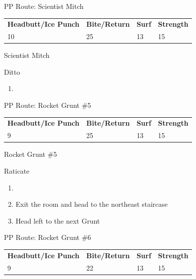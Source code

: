 \begin{paracol}{2}
\switchcolumn*
\begin{misc}{PP Route: Scientist Mitch}
	\varwb
	\begin{tabu} to \textwidth {X[6,c] X[5,c] X[4,c] X[4,c]}
		\textbf{Headbutt/Ice Punch} & \textbf{Bite/Return} & \textbf{Surf} & \textbf{Strength}\\ 
		10 & 25 & 13 & 15
	\end{tabu}
	\varwe
\end{misc}

\switchcolumn
\begin{trainer}{Scientist Mitch}
	\varwb
	\begin{fightSection}{Ditto}
		\item {} \headbutt
	\end{fightSection}
	\varwe
\end{trainer}

\begin{enumerate}[resume]
	\item {}
\end{enumerate}

\switchcolumn*
\begin{misc}{PP Route: Rocket Grunt \#5}
	\varwb
	\begin{tabu} to \textwidth {X[6,c] X[5,c] X[4,c] X[4,c]}
		\textbf{Headbutt/Ice Punch} & \textbf{Bite/Return} & \textbf{Surf} & \textbf{Strength}\\ 
		9 & 25 & 13 & 15
	\end{tabu}
	\varwe
\end{misc}

\switchcolumn
\begin{trainer}{Rocket Grunt \#5}
	\varwb
	\begin{fightSection}{Raticate}
		\item {} \headbutt
	\end{fightSection}
	\varwe
\end{trainer}

\begin{enumerate}[resume]
	\item {}
	\item Exit the room and head to the northeast staircase
	\item Head left to the next Grunt
\end{enumerate}

\switchcolumn*
\begin{misc}{PP Route: Rocket Grunt \#6}
	\varwb
	\begin{tabu} to \textwidth {X[6,c] X[5,c] X[4,c] X[4,c]}
		\textbf{Headbutt/Ice Punch} & \textbf{Bite/Return} & \textbf{Surf} & \textbf{Strength}\\ 
		9 & 22 & 13 & 15
	\end{tabu}
	\varwe
\end{misc}


\end{paracol}
